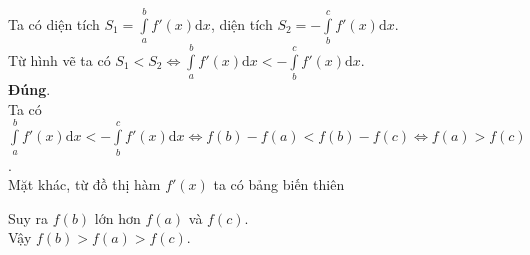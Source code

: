 \begin{ex}
{\begin{itemchoice}
\begin{center}
			\end{center}
			Ta có diện tích $S_1=\displaystyle\int \limits_a^b f'(x)\mathrm{d}x$, diện tích $S_2=-\displaystyle\int \limits_b^c f'(x)\mathrm{d}x$.\\
			Từ hình vẽ ta có $S_1<S_2 \Leftrightarrow \displaystyle\int \limits_a^b f'(x)\mathrm{d}x<-\displaystyle\int \limits_b^c f'(x)\mathrm{d}x$.\\
			\itemch \textbf{Đúng}.\\
			Ta có $\displaystyle\int \limits_a^b f'(x)\mathrm{d}x<-\displaystyle\int \limits_b^c f'(x)\mathrm{d}x\Leftrightarrow f(b)-f(a)<f(b)-f(c) \Leftrightarrow f(a)>f(c)$.\\
			Mặt khác, từ đồ thị hàm $f'(x)$ ta có bảng biến thiên
			\begin{center}
			\end{center}
			Suy ra $f(b)$ lớn hơn $f(a)$ và $f(c)$.\\
			Vậy $f(b)>f(a)>f(c)$.
		\end{itemchoice}
	}
\end{ex}
